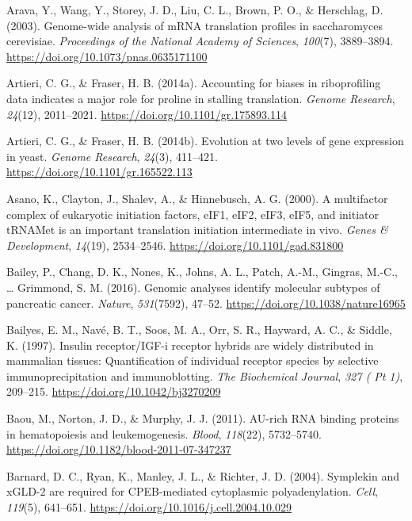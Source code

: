 \documentclass[12pt,openany]{book}
\begin{document}
\hypertarget{ref-Arava2003}{}
Arava, Y., Wang, Y., Storey, J. D., Liu, C. L., Brown, P. O., \&
Herschlag, D. (2003). Genome-wide analysis of mRNA translation profiles
in saccharomyces cerevisiae. \emph{Proceedings of the National Academy
of Sciences}, \emph{100}(7), 3889--3894.
\url{https://doi.org/10.1073/pnas.0635171100}

\hypertarget{ref-Artieri2014a}{}
Artieri, C. G., \& Fraser, H. B. (2014a). Accounting for biases in
riboprofiling data indicates a major role for proline in stalling
translation. \emph{Genome Research}, \emph{24}(12), 2011--2021.
\url{https://doi.org/10.1101/gr.175893.114}

\hypertarget{ref-Artieri2014}{}
Artieri, C. G., \& Fraser, H. B. (2014b). Evolution at two levels of
gene expression in yeast. \emph{Genome Research}, \emph{24}(3),
411--421. \url{https://doi.org/10.1101/gr.165522.113}

\hypertarget{ref-Asano2000}{}
Asano, K., Clayton, J., Shalev, A., \& Hinnebusch, A. G. (2000). A
multifactor complex of eukaryotic initiation factors, eIF1, eIF2, eIF3,
eIF5, and initiator tRNAMet is an important translation initiation
intermediate in vivo. \emph{Genes \& Development}, \emph{14}(19),
2534--2546. \url{https://doi.org/10.1101/gad.831800}

\hypertarget{ref-Bailey2016}{}
Bailey, P., Chang, D. K., Nones, K., Johns, A. L., Patch, A.-M.,
Gingras, M.-C., \ldots{} Grimmond, S. M. (2016). Genomic analyses
identify molecular subtypes of pancreatic cancer. \emph{Nature},
\emph{531}(7592), 47--52. \url{https://doi.org/10.1038/nature16965}

\hypertarget{ref-Bailyes1997}{}
Bailyes, E. M., Navé, B. T., Soos, M. A., Orr, S. R., Hayward, A. C., \&
Siddle, K. (1997). Insulin receptor/IGF-i receptor hybrids are widely
distributed in mammalian tissues: Quantification of individual receptor
species by selective immunoprecipitation and immunoblotting. \emph{The
Biochemical Journal}, \emph{327 ( Pt 1)}, 209--215.
\url{https://doi.org/10.1042/bj3270209}

\hypertarget{ref-Baou2011}{}
Baou, M., Norton, J. D., \& Murphy, J. J. (2011). AU-rich RNA binding
proteins in hematopoiesis and leukemogenesis. \emph{Blood},
\emph{118}(22), 5732--5740.
\url{https://doi.org/10.1182/blood-2011-07-347237}

\hypertarget{ref-Barnard2004}{}
Barnard, D. C., Ryan, K., Manley, J. L., \& Richter, J. D. (2004).
Symplekin and xGLD-2 are required for CPEB-mediated cytoplasmic
polyadenylation. \emph{Cell}, \emph{119}(5), 641--651.
\url{https://doi.org/10.1016/j.cell.2004.10.029}
\end{document}
